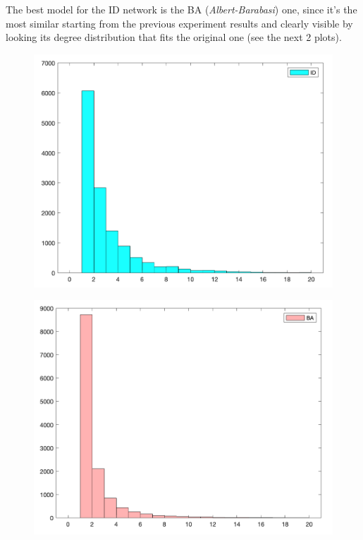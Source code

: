 \documentclass{article}
\begin{document}
    \bigskip
    \bigskip
    
    \par\noindent The best model for the ID network is the BA (\textit{Albert-Barabasi}) one, since it's the most similar starting from the previous experiment results and clearly visible by looking its degree distribution that fits the original one (see the next 2 plots).
    
    \begin{figure}[H]
        \centering
        \begin{minipage}[b]{0.48\textwidth}
            \includegraphics[width=\textwidth]{ID.png}
            \label{fig:figure-4-a}
        \end{minipage}
        \hfill
        \begin{minipage}[b]{0.48\textwidth}
            \includegraphics[width=\textwidth]{BA.png}
            \label{fig:figure-4-b}
        \end{minipage}
        \label{fig:figure-4}
    \end{figure}
\end{document}
